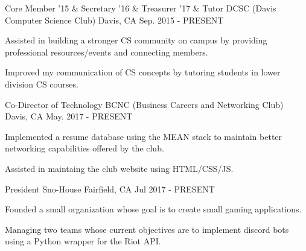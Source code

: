 

\begin{cventries}

  \cventry
    {Core Member '15 \& Secretary '16 \& Treasurer '17 \& Tutor} %
    {DCSC (Davis Computer Science Club)} %
    {Davis, CA} %
    {Sep. 2015 - PRESENT} %
    {
      \begin{cvitems} %
        \item {Assisted in building a stronger CS community on campus by providing professional resources/events and connecting members.}
        \item {Improved my communication of CS concepts by tutoring students in lower division CS courses.}
      \end{cvitems}
    }

  \cventry
    {Co-Director of Technology} %
    {BCNC (Business Careers and Networking Club)} %
    {Davis, CA} %
    {May. 2017 - PRESENT} %
    {
      \begin{cvitems} %
        \item {Implemented a resume database using the MEAN stack to maintain better networking capabilities offered by the club.}
        \item {Assisted in maintaing the club website using HTML/CSS/JS.}
      \end{cvitems}
    }

  \cventry
    {President} %
    {Sno-House} %
    {Fairfield, CA} %
    {Jul 2017 - PRESENT} %
    {
      \begin{cvitems} %
          \item {Founded a small organization whose goal is to create small gaming applications.}
          \item {Managing two teams whose current objectives are to implement discord bots using a Python wrapper for the Riot API.}
      \end{cvitems}
    }
\end{cventries}
